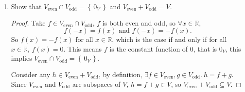 \documentclass{article}
\theoremstyle{definition}
\numberwithin{equation}{problem}
\newcommand{\R}{\mathbb{R}}
\newcommand{\set}[1]{\left\{\,#1\,\right\}}
\renewcommand{\vec}[1]{\mathit{#1}_V}
\begin{document}
\begin{enumerate}[label=(\alph*)]
\begin{proof}
            Now consider $f,g \in V_\text{odd}$, then $\forall x\in \R$,
            \begin{align*}
                (f+g)(-x) &= f(-x) + g(-x)  \\
                &= -f(x) -g(x)      \\
                &= -(f(x) + g(x))    \\
                &= -(f+g)(x)
            \end{align*}
            Thus $f+g \in V_\text{odd}$.
            Consider any $f\in V_\text{odd}, k\in \R$, then $\forall x\in \R$,
            \begin{align*}
                (kf)(-x) &= k\cdot f(-x)    \\
                &= k\cdot (-f(x))   \\
                &= -k\cdot f(x) \\
                &= -(k\cdot f(x)) = -(kf)(x)
            \end{align*}
            Thus $kf \in V_\text{odd}$.
            Therefore $V_\text{odd}$ is a subspace of $V$.
        \end{proof}
    \item Show that $V_\text{even} \cap V_\text{odd} = \set{\vec{0}}$ and $V_\text{even} + V_\text{odd} = V$.
        \begin{proof}
            Take $f\in V_\text{even} \cap V_\text{odd}$, $f$ is both even and odd, so $\forall x\in \R$,
            $$f(-x) = f(x) \text{ and } f(-x) = -f(x).$$
            So $f(x) = -f(x)$ for all $x\in \R$, which is the case if and only if for all $x\in \R$, $f(x) = 0$.
            This means $f$ is the constant function of $0$, that is $\vec{0}$, this implies $V_\text{even} \cap V_\text{odd} = \set{\vec{0}}$.

            Consider any $h \in V_\text{even} + V_\text{odd}$, by definition, $\exists f \in V_\text{even}, g \in V_\text{odd}.~ h = f + g$.
            Since $V_\text{even}$ and $V_\text{odd}$ are subspaces of $V$, $h = f + g \in V$,
            so $V_\text{even} + V_\text{odd} \subseteq V$.


\end{proof}
\end{enumerate}
\end{document}
